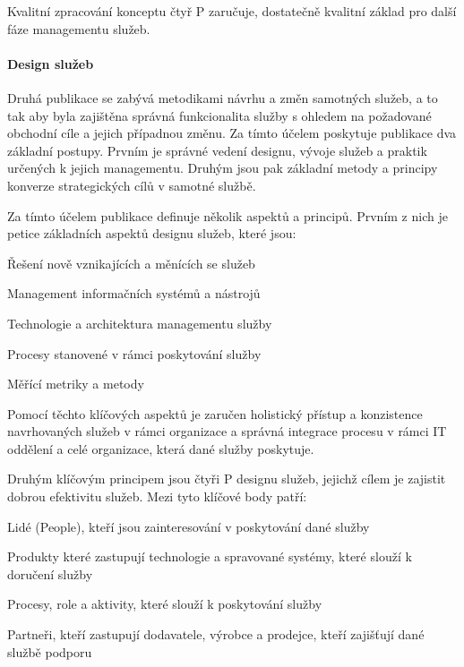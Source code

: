 \documentclass[
  digital,     %
  twoside,     %
  lof,         %
  lot,         %
]{fithesis4}
\begin{document}
Kvalitní zpracování konceptu čtyř P zaručuje, dostatečně kvalitní základ pro další fáze managementu služeb.


\paragraph{Design služeb}
Druhá publikace se zabývá metodikami návrhu a změn samotných služeb, a to tak aby byla zajištěna správná funkcionalita služby s ohledem na požadované obchodní cíle a jejich případnou změnu. Za tímto účelem poskytuje publikace dva základní postupy. Prvním je správné vedení designu, vývoje služeb a praktik určených k jejich managementu. Druhým jsou pak základní metody a principy konverze strategických cílů v samotné službě.\parencite[s.~21]{Carlidge2007}

Za tímto účelem publikace definuje několik aspektů a principů. Prvním z nich je petice základních aspektů designu služeb, které jsou: \parencite[s.~22]{Carlidge2007}
\begin{compactitem}
    \item Řešení nově vznikajících a měnících se služeb
    \item Management informačních systémů a nástrojů
    \item Technologie a architektura managementu služby
    \item Procesy stanovené v rámci poskytování služby
    \item Měřící metriky a metody
\end{compactitem}
Pomocí těchto klíčových aspektů je zaručen holistický přístup a konzistence navrhovaných služeb v rámci organizace a správná integrace procesu v rámci IT oddělení a celé organizace, která dané služby poskytuje. \parencite[s.~22]{Carlidge2007}

Druhým klíčovým principem jsou čtyři P designu služeb, jejichž cílem je zajistit dobrou efektivitu služeb. Mezi tyto klíčové body patří:\parencite[s.~22]{Carlidge2007}
\begin{compactitem}
    \item Lidé (People), kteří jsou zainteresování v poskytování dané služby
    \item Produkty které zastupují technologie a spravované systémy, které slouží k doručení služby
    \item Procesy, role a aktivity, které slouží k poskytování služby
    \item Partneři, kteří zastupují dodavatele, výrobce a prodejce, kteří zajišťují dané službě podporu
\end{compactitem}
\end{document}
